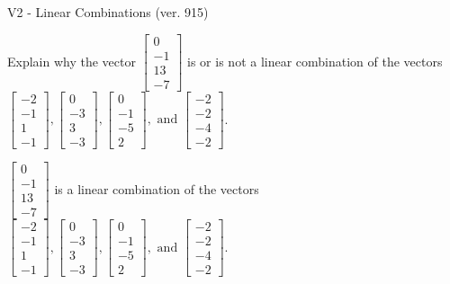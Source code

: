 \begin{exercise}
  \begin{exerciseTitle}V2 - Linear Combinations (ver. 915)\end{exerciseTitle}
  \begin{exerciseStatement}
    Explain why the vector \(\left[\begin{array}{c}
0 \\
-1 \\
13 \\
-7
\end{array}\right]\)  is or is not a linear 
	combination of the vectors \(\left[\begin{array}{c}
-2 \\
-1 \\
1 \\
-1
\end{array}\right] , \left[\begin{array}{c}
0 \\
-3 \\
3 \\
-3
\end{array}\right] , \left[\begin{array}{c}
0 \\
-1 \\
-5 \\
2
\end{array}\right] , \text{ and } \left[\begin{array}{c}
-2 \\
-2 \\
-4 \\
-2
\end{array}\right]\).
	


  \end{exerciseStatement}
  \begin{exerciseAnswer}
   \(\left[\begin{array}{c}
0 \\
-1 \\
13 \\
-7
\end{array}\right]\) 
  	 is  
	a linear combination of the vectors \(\left[\begin{array}{c}
-2 \\
-1 \\
1 \\
-1
\end{array}\right] , \left[\begin{array}{c}
0 \\
-3 \\
3 \\
-3
\end{array}\right] , \left[\begin{array}{c}
0 \\
-1 \\
-5 \\
2
\end{array}\right] , \text{ and } \left[\begin{array}{c}
-2 \\
-2 \\
-4 \\
-2
\end{array}\right]\).


\end{exerciseAnswer}
\end{exercise}
